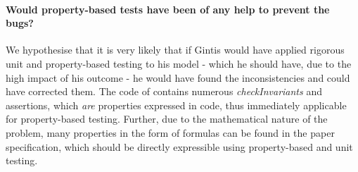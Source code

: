 \paragraph{Would property-based tests have been of any help to prevent the bugs?}
We hypothesise that it is very likely that if Gintis would have applied rigorous unit and property-based testing to his model - which he should have, due to the high impact of his outcome - he would have found the inconsistencies and could have corrected them. The code of \cite{evensen_extensible_2010} contains numerous \textit{checkInvariants} and assertions, which \textit{are} properties expressed in code, thus immediately applicable for property-based testing. Further, due to the mathematical nature of the problem, many properties in the form of formulas can be found in the paper specification, which should be directly expressible using property-based and unit testing.
